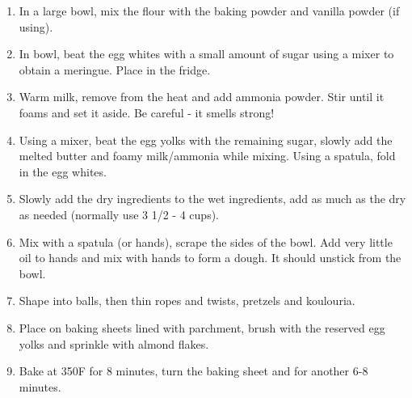 \begin{enumerate}
    \item In a large bowl, mix the flour with the baking powder and vanilla powder (if using).
    \item In bowl, beat the egg whites with a small amount of sugar using a mixer to obtain a meringue. Place in the fridge.
    \item Warm milk, remove from the heat and add ammonia powder. Stir until it foams and set it aside. Be careful - it smells strong!
    \item Using a mixer, beat the egg yolks with the remaining sugar, slowly add the melted butter and foamy milk/ammonia while mixing. Using a spatula, fold in the egg whites.
    \item Slowly add the dry ingredients to the wet ingredients, add as much as the dry as needed (normally use 3 1/2 - 4 cups).
    \item Mix with a spatula (or hands), scrape the sides of the bowl. Add very little oil to hands and mix with hands to form a dough. It should unstick from the bowl.
    \item Shape into balls, then thin ropes and twists, pretzels and koulouria.
    \item Place on baking sheets lined with parchment, brush with the reserved egg yolks and sprinkle with almond flakes.
    \item Bake at 350\degree F for 8 minutes, turn the baking sheet and for another 6-8 minutes.
\end{enumerate}

%


